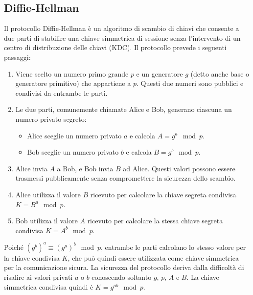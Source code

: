 \documentclass[12pt]{report}
\begin{document}
\subsection{Diffie-Hellman}  
Il protocollo Diffie-Hellman è un algoritmo di scambio di chiavi che consente a due parti di stabilire una chiave simmetrica di sessione senza l'intervento di un centro di distribuzione delle chiavi (KDC). Il protocollo prevede i seguenti passaggi:  
\begin{enumerate}  
    \item Viene scelto un numero primo grande \( p \) e un generatore \( g \) (detto anche base o generatore primitivo) che appartiene a \( p \). Questi due numeri sono pubblici e condivisi da entrambe le parti.  
    \item Le due parti, comunemente chiamate Alice e Bob, generano ciascuna un numero privato segreto:  
    \begin{itemize}  
        \item Alice sceglie un numero privato \( a \) e calcola \( A = g^a \mod p \).  
        \item Bob sceglie un numero privato \( b \) e calcola \( B = g^b \mod p \).  
    \end{itemize}  
    \item Alice invia \( A \) a Bob, e Bob invia \( B \) ad Alice. Questi valori possono essere trasmessi pubblicamente senza compromettere la sicurezza dello scambio.  
    \item Alice utilizza il valore \( B \) ricevuto per calcolare la chiave segreta condivisa \( K = B^a \mod p \).  
    \item Bob utilizza il valore \( A \) ricevuto per calcolare la stessa chiave segreta condivisa \( K = A^b \mod p \).  
\end{enumerate}  
Poiché \( (g^b)^a \equiv (g^a)^b \mod p \), entrambe le parti calcolano lo stesso valore per la chiave condivisa \( K \), che può quindi essere utilizzata come chiave simmetrica per la comunicazione sicura. La sicurezza del protocollo deriva dalla difficoltà di risalire ai valori privati \( a \) o \( b \) conoscendo soltanto \( g \), \( p \), \( A \) e \( B \). La chiave simmetrica condivisa quindi è $K = g^{ab} \mod p$.
\end{document}
